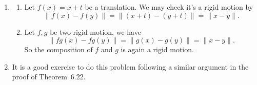 \begin{enumerate}
\begin{enumerate}
\item Compute 
\[\tr(B^*B)=\tr((P^*AP)^*(P^*AP))=\tr(P^*A^*AP)=\tr(A^*A).\]
\item We compute the trace of $A^*A$ and get 
\[\tr(A^*A)=\sum_{i=1}^n{(A^*A)_{ii}}\]
\[=\sum_{i=1}^n{\sum_{k=1}^n{(A^*)_{ik}A_{ki}}}=\sum_{i,j}{|A_{ij}|^2}.\]
Use the result in the previous argument we get the conclusion.
\item By the previous argument, they are not unitarily equivalent since 
\[|1|^2+|2|^2+|2|^2+|i|^2=10\]
is not equal to 
\[|i|^2+|4|^2+|1|^2+|1|^2=19.\]
\end{enumerate}
\item \begin{enumerate}
\item Let $f(x)=x+t$ be a translation. We may check it's a rigid motion by 
\[\|f(x)-f(y)\|=\|(x+t)-(y+t)\|=\|x-y\|.\]
\item Let $f,g$ be two rigid motion, we have 
\[\|fg(x)-fg(y)\|=\|g(x)-g(y)\|=\|x-y\|.\]
So the composition of $f$ and $g$ is again a rigid motion.
\end{enumerate}
\item It is a good exercise to do this problem following a similar argument in the proof of Theorem~6.22.  


\end{enumerate}
